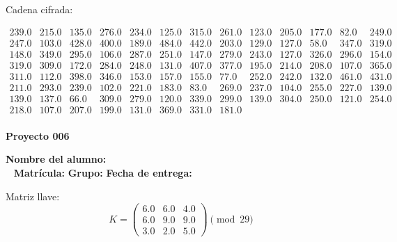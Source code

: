 \documentclass[12pt]{article}
\begin{document}
Cadena cifrada:
\begin{center}
$\begin{array}{lllllllllllll}
239.0 & 215.0 & 135.0 & 276.0 & 234.0 & 125.0 & 315.0 & 261.0 & 123.0 & 205.0 & 177.0 & 82.0 & 249.0\\
247.0 & 103.0 & 428.0 & 400.0 & 189.0 & 484.0 & 442.0 & 203.0 & 129.0 & 127.0 & 58.0 & 347.0 & 319.0\\
148.0 & 349.0 & 295.0 & 106.0 & 287.0 & 251.0 & 147.0 & 279.0 & 243.0 & 127.0 & 326.0 & 296.0 & 154.0\\
319.0 & 309.0 & 172.0 & 284.0 & 248.0 & 131.0 & 407.0 & 377.0 & 195.0 & 214.0 & 208.0 & 107.0 & 365.0\\
311.0 & 112.0 & 398.0 & 346.0 & 153.0 & 157.0 & 155.0 & 77.0 & 252.0 & 242.0 & 132.0 & 461.0 & 431.0\\
211.0 & 293.0 & 239.0 & 102.0 & 221.0 & 183.0 & 83.0 & 269.0 & 237.0 & 104.0 & 255.0 & 227.0 & 139.0\\
139.0 & 137.0 & 66.0 & 309.0 & 279.0 & 120.0 & 339.0 & 299.0 & 139.0 & 304.0 & 250.0 & 121.0 & 254.0\\
218.0 & 107.0 & 207.0 & 199.0 & 131.0 & 369.0 & 331.0 & 181.0\\
\end{array}$
\end{center}

\newpage


\textbf{Proyecto 006}

\textbf{Nombre del alumno:} \underline{\hspace{13cm}}\\\
\vspace{1cm}
\textbf{Matrícula:} \underline{\hspace{4cm}} \hspace{1cm}
\textbf{Grupo:} \underline{\hspace{2cm}}
\textbf{Fecha de entrega:} \underline{\hspace{2cm}}

\medskip

Matriz llave:
\[
K = \begin{pmatrix}
6.0 & 6.0 & 4.0\\
6.0 & 9.0 & 9.0\\
3.0 & 2.0 & 5.0
\end{pmatrix} \pmod{29}
\]
\end{document}
